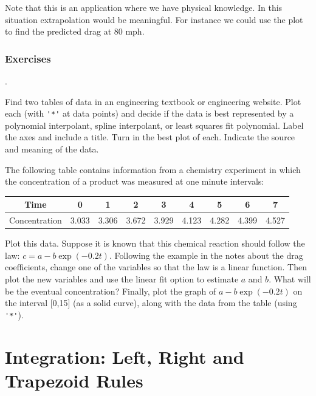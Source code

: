 Note that this is an application where we have physical knowledge. In this
situation extrapolation would be meaningful. For instance we could use
the plot to find the predicted drag at 80 mph.


\newpage
\subsection*{Exercises}
\begin{list}
{.}{}


\item Find two tables of data in an engineering textbook or
  engineering website. Plot each (with \verb&'*'& at data points) and decide if the data is best
  represented by a polynomial interpolant, spline interpolant, or
  least squares fit polynomial.  Label the axes and include a title.
  Turn in the best plot of each.
  Indicate the source and meaning of the data.


\item
  The following table contains information from a chemistry experiment
  in which the concentration of a product was measured at one minute
  intervals:

  \begin{tabular}{c|cccccccc}
    Time & 0     & 1     & 2     & 3     & 4     & 5     & 6     & 7 \\
    \hline
    Concentration & 3.033 & 3.306 & 3.672 & 3.929 & 4.123 & 4.282 & 4.399 & 4.527
  \end{tabular}

  Plot this data. Suppose it is known that this chemical
  reaction should follow the law: $c = a - b \exp(-0.2 t)$. Following
  the example in the notes about the drag coefficients, change
  one of the variables so that the law is a linear function. Then
  plot the new variables and use the linear fit option to estimate
  $a$ and $b$. What will be the eventual concentration? Finally,
  plot the graph of $a - b \exp(-0.2 t)$ on the interval [0,15] (as a
  solid curve), along with the data from the table (using \verb&'*'&).
\end{list}




\chapter{Integration: Left, Right and Trapezoid Rules}
\label{sec:LRTrules}

